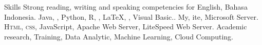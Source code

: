 
\begin{rubric}{Skills}
\entry*[Languages]
	Strong reading, writing and speaking competencies for English, Bahasa Indonesia.
	Java, , Python, R, , \LaTeX, , Visual Basic..
\entry*[Databases]
	My, ite, Microsoft  Server.
	\textsc{Html, css}, JavaScript, Apache Web Server, LiteSpeed Web Server.
\entry*[Misc.]
	Academic research, Training, Data Analytic, Machine Learning, Cloud Computing.
\end{rubric}
